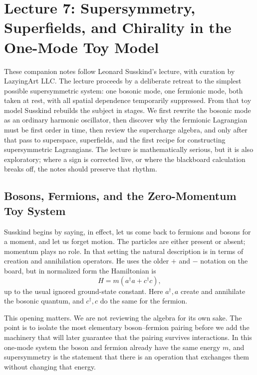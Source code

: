 \chapter{Lecture 7: Supersymmetry, Superfields, and Chirality in the One-Mode Toy Model}

These companion notes follow Leonard Susskind's lecture, with curation by LazyingArt LLC. The lecture proceeds by a deliberate retreat to the simplest possible supersymmetric system: one bosonic mode, one fermionic mode, both taken at rest, with all spatial dependence temporarily suppressed. From that toy model Susskind rebuilds the subject in stages. We first rewrite the bosonic mode as an ordinary harmonic oscillator, then discover why the fermionic Lagrangian must be first order in time, then review the supercharge algebra, and only after that pass to superspace, superfields, and the first recipe for constructing supersymmetric Lagrangians. The lecture is mathematically serious, but it is also exploratory; where a sign is corrected live, or where the blackboard calculation breaks off, the notes should preserve that rhythm.

\section{Bosons, Fermions, and the Zero-Momentum Toy System}

Susskind begins by saying, in effect, let us come back to fermions and bosons for a moment, and let us forget motion. The particles are either present or absent; momentum plays no role. In that setting the natural description is in terms of creation and annihilation operators. He uses the older \(+\) and \(-\) notation on the board, but in normalized form the Hamiltonian is
\begin{equation}
H = m\left(a^\dagger a + c^\dagger c\right),
\end{equation}
up to the usual ignored ground-state constant. Here \(a^\dagger,a\) create and annihilate the bosonic quantum, and \(c^\dagger,c\) do the same for the fermion.

This opening matters. We are not reviewing the algebra for its own sake. The point is to isolate the most elementary boson--fermion pairing before we add the machinery that will later guarantee that the pairing survives interactions. In this one-mode system the boson and fermion already have the same energy \(m\), and supersymmetry is the statement that there is an operation that exchanges them without changing that energy.


